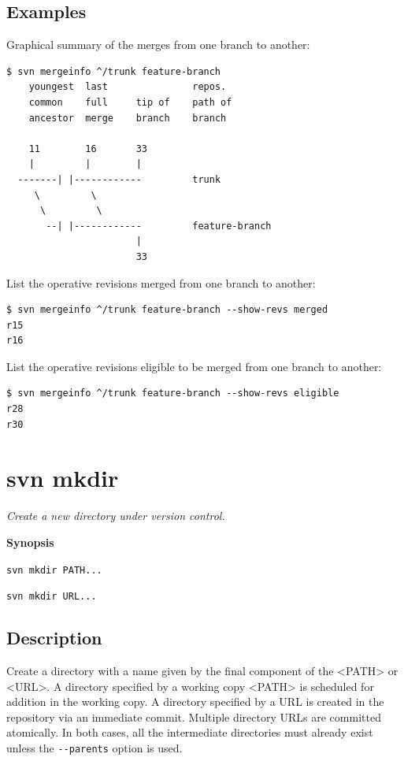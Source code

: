 \subsection{Examples}

Graphical summary of the merges from one branch to another:

\begin{verbatim}
$ svn mergeinfo ^/trunk feature-branch
    youngest  last               repos.
    common    full     tip of    path of
    ancestor  merge    branch    branch

    11        16       33
    |         |        |
  -------| |------------         trunk
     \         \
      \         \
       --| |------------         feature-branch
                       |
                       33
\end{verbatim}

List the operative revisions merged from one branch to another:

\begin{verbatim}
$ svn mergeinfo ^/trunk feature-branch --show-revs merged
r15
r16
\end{verbatim}

List the operative revisions eligible to be merged from one branch to
another:

\begin{verbatim}
$ svn mergeinfo ^/trunk feature-branch --show-revs eligible
r28
r30
\end{verbatim}

\section{svn mkdir}\label{svn.ref.svn.c.mkdir}

\emph{Create a new directory under version control.}

\textbf{Synopsis}

\texttt{svn\ mkdir\ PATH...}

\texttt{svn\ mkdir\ URL...}

\subsection{Description}

Create a directory with a name given by the final component of the
\textless PATH\textgreater{} or \textless URL\textgreater. A directory
specified by a working copy \textless PATH\textgreater{} is scheduled
for addition in the working copy. A directory specified by a URL is
created in the repository via an immediate commit. Multiple directory
URLs are committed atomically. In both cases, all the intermediate
directories must already exist unless the \texttt{-\/-parents} option is
used.

